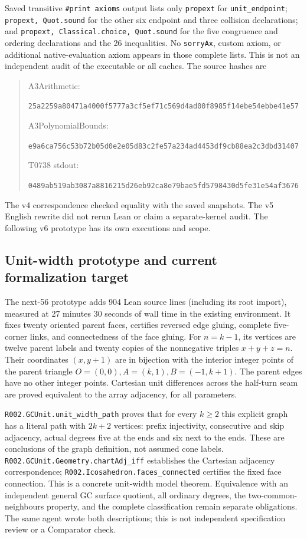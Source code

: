 \documentclass[11pt]{amsart}
\newcommand{\record}[1]{\nolinkurl{#1}}
\begin{document}
Saved transitive \texttt{\#print axioms} output lists only
\record{propext} for \record{unit_endpoint}; \texttt{propext, Quot.sound}
for the other six endpoint and three collision declarations; and
\texttt{propext, Classical.choice, Quot.sound} for the five congruence
and ordering declarations and the 26 inequalities. No \record{sorryAx},
custom axiom, or additional native-evaluation axiom appears in those
complete lists. This is not an independent audit of the executable
or all caches. The source hashes are
\begin{quote}\small
A3Arithmetic:\par
\record{25a2259a80471a4000f5777a3cf5ef71c569d4ad00f8985f14ebe54ebbe41e57}\par
A3PolynomialBounds:\par
\record{e9a6ca756c53b72b05d0e2e05d83c2fe57a234ad4453df9cb88ea2c3dbd31407}\par
T0738 stdout:\par
\record{0489ab519ab3087a8816215d26eb92ca8e79bae5fd5798430d5fe31e54af3676}
\end{quote}
The v4 correspondence checked equality with the saved snapshots.
The v5 English rewrite did not rerun Lean or claim a separate-kernel audit.
The following v6 prototype has its own executions and scope.

\subsection{Unit-width prototype and current formalization target}
The next-56 prototype adds 904 Lean source lines (including its root
import), measured at 27 minutes 30 seconds of wall time in the existing
environment. It fixes twenty oriented parent faces, certifies reversed
edge gluing, complete five-corner links, and connectedness of the face
gluing. For $n=k-1$, its vertices are twelve parent labels and twenty
copies of the nonnegative triples $x+y+z=n$. Their coordinates $(x,y+1)$
are in bijection with the interior integer points of the parent triangle
$O=(0,0), A=(k,1), B=(-1,k+1)$. The parent edges have no other integer
points. Cartesian unit differences across the half-turn seam are proved
equivalent to the array adjacency, for all parameters.

\record{R002.GCUnit.unit_width_path} proves that for every $k\ge2$ this
explicit graph has a literal path with $2k+2$ vertices: prefix
injectivity, consecutive and skip adjacency, actual degrees five at
the ends and six next to the ends. These are conclusions of the graph
definition, not assumed cone labels.
\record{R002.GCUnit.Geometry.chartAdj_iff} establishes the Cartesian
adjacency correspondence; \record{R002.Icosahedron.faces_connected}
certifies the fixed face connection. This is a concrete unit-width
model theorem. Equivalence with an independent general GC surface
quotient, all ordinary degrees, the two-common-neighbours property,
and the complete classification remain separate obligations. The same
agent wrote both descriptions; this is not independent specification
review or a Comparator check.
\end{document}
